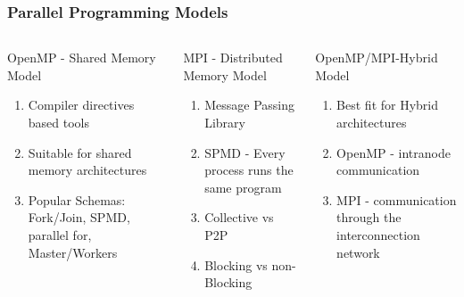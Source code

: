 \documentclass{beamer}
\begin{document}
\begin{frame}
\frametitle{Parallel Programming Models}
\begin{columns}[c]

\linespread{0.5}
\begin{block}{OpenMP - Shared Memory Model}
\begin{enumerate}
\item {\fontsize{8}{6}\selectfont Compiler directives based tools}
\item {\fontsize{8}{6}\selectfont Suitable for shared memory architectures}
\item {\fontsize{8}{6}\selectfont Popular Schemas: Fork/Join, SPMD, parallel for, Master/Workers}
\end{enumerate}
\end{block}

\begin{block}{MPI - Distributed Memory Model}
\begin{enumerate}
\item {\fontsize{8}{6}\selectfont Message Passing Library}
\item {\fontsize{8}{6}\selectfont SPMD - Every process runs the same program}
\item {\fontsize{8}{6}\selectfont Collective vs P2P}
\item {\fontsize{8}{6}\selectfont Blocking vs non-Blocking}
\end{enumerate}
\end{block}

\begin{block}{OpenMP/MPI-Hybrid Model}
\begin{enumerate}
\item {\fontsize{8}{6}\selectfont Best fit for Hybrid architectures}
\item {\fontsize{8}{6}\selectfont OpenMP - intranode communication }
\item {\fontsize{8}{6}\selectfont MPI - communication through the interconnection network}
\end{enumerate}
\end{block}


\end{columns}

\end{frame}
\end{document}
